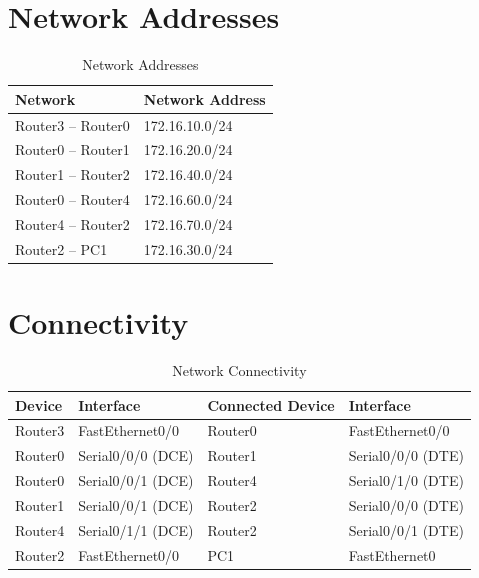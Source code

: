 \documentclass[12pt, a4paper]{report}
\begin{document}
\section*{Network Addresses}
\begin{table}[H]
	\centering
	\begin{tabular}{|l|l|}
		\hline
		\textbf{Network} & \textbf{Network Address} \\ \hline
		Router3 -- Router0 & 172.16.10.0/24 \\ \hline
		Router0 -- Router1 & 172.16.20.0/24 \\ \hline
		Router1 -- Router2 & 172.16.40.0/24 \\ \hline
		Router0 -- Router4 & 172.16.60.0/24 \\ \hline
		Router4 -- Router2 & 172.16.70.0/24 \\ \hline
		Router2 -- PC1     & 172.16.30.0/24 \\ \hline
	\end{tabular}
	\caption{Network Addresses}
\end{table}

\section*{Connectivity}
\begin{table}[H]
	\centering
	\begin{tabular}{|l|l|l|l|}
		\hline
		\textbf{Device} & \textbf{Interface} & \textbf{Connected Device} & \textbf{Interface} \\ \hline
		Router3 & FastEthernet0/0   & Router0 & FastEthernet0/0   \\ \hline
		Router0 & Serial0/0/0 (DCE) & Router1 & Serial0/0/0 (DTE) \\ \hline
		Router0 & Serial0/0/1 (DCE) & Router4 & Serial0/1/0 (DTE) \\ \hline
		Router1 & Serial0/0/1 (DCE) & Router2 & Serial0/0/0 (DTE) \\ \hline
		Router4 & Serial0/1/1 (DCE) & Router2 & Serial0/0/1 (DTE) \\ \hline
		Router2 & FastEthernet0/0   & PC1     & FastEthernet0     \\ \hline
	\end{tabular}
	\caption{Network Connectivity}
\end{table}
\end{document}
